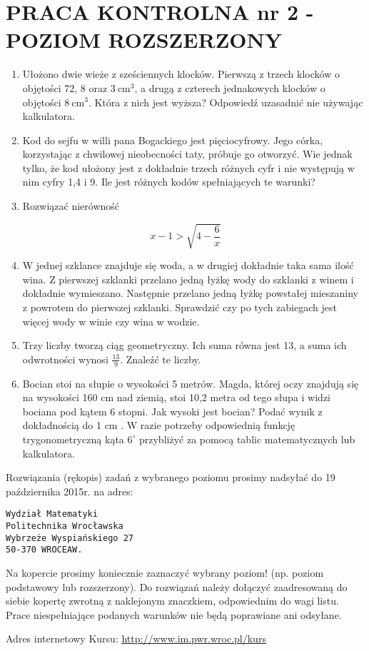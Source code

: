 \documentclass[10pt]{article}
\begin{document}
\section*{PRACA KONTROLNA nr 2 - POZIOM ROZSZERZONY}
\begin{enumerate}
  \item Ułożono dwie wieże z sześciennych klocków. Pierwszą z trzech klocków o objętości 72, 8 oraz $3 \mathrm{~cm}^{3}$, a drugą z czterech jednakowych klocków o objętości $8 \mathrm{~cm}^{3}$. Która z nich jest wyższa? Odpowiedź uzasadnić nie używając kalkulatora.
  \item Kod do sejfu w willi pana Bogackiego jest pięciocyfrowy. Jego córka, korzystając z chwilowej nieobecności taty, próbuje go otworzyć. Wie jednak tylko, że kod ułożony jest z dokładnie trzech różnych cyfr i nie występują w nim cyfry 1,4 i 9. Ile jest różnych kodów spełniających te warunki?
  \item Rozwiązać nierówność
\end{enumerate}

$$
x-1>\sqrt{4-\frac{6}{x}}
$$

\begin{enumerate}
  \setcounter{enumi}{3}
  \item W jednej szklance znajduje się woda, a w drugiej dokładnie taka sama ilość wina. Z pierwszej szklanki przelano jedną łyżkę wody do szklanki z winem i dokładnie wymieszano. Następnie przelano jedną łyżkę powstałej mieszaniny z powrotem do pierwszej szklanki. Sprawdzić czy po tych zabiegach jest więcej wody w winie czy wina w wodzie.
  \item Trzy liczby tworzą ciąg geometryczny. Ich suma równa jest 13, a suma ich odwrotności wynosi $\frac{13}{9}$. Znaleźć te liczby.
  \item Bocian stoi na słupie o wysokości 5 metrów. Magda, której oczy znajdują się na wysokości 160 cm nad ziemią, stoi 10,2 metra od tego słupa i widzi bociana pod kątem 6 stopni. Jak wysoki jest bocian? Podać wynik z dokładnością do 1 cm . W razie potrzeby odpowiednią funkcję trygonometryczną kąta $6^{\circ}$ przybliżyć za pomocą tablic matematycznych lub kalkulatora.
\end{enumerate}

Rozwiązania (rękopis) zadań z wybranego poziomu prosimy nadsyłać do 19 października 2015r. na adres:

\begin{verbatim}
Wydział Matematyki
Politechnika Wrocławska
Wybrzeże Wyspiańskiego 27
50-370 WROCEAW.
\end{verbatim}

Na kopercie prosimy koniecznie zaznaczyć wybrany poziom! (np. poziom podstawowy lub rozszerzony). Do rozwiązań należy dołączyć zaadresowaną do siebie kopertę zwrotną z naklejonym znaczkiem, odpowiednim do wagi listu. Prace niespełniające podanych warunków nie będą poprawiane ani odsyłane.

Adres internetowy Kursu: \href{http://www.im.pwr.wroc.pl/kurs}{http://www.im.pwr.wroc.pl/kurs}
\end{document}
